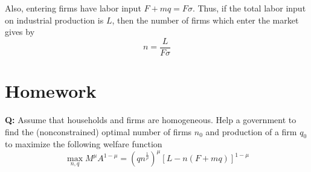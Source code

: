 \documentclass{article}
\begin{document}
Also, entering firms have labor input $F+mq = F \sigma$. Thus, if the total labor input on industrial production is $L$, then the number of firms which enter the market gives by
$$n=\frac{L}{F\sigma}$$

\section{Homework}
\textbf{Q:} Assume that households and firms are homogeneous. Help a government to find the (nonconstrained) optimal number of firms $n_0$ and production of a firm $q_0$ to maximize the following welfare function
$$\max_{n,q} M^{\mu}A^{1-\mu} = (qn^{\frac{1}{\rho}})^{\mu} [L - n ( F+mq)]^{1-\mu}$$
\end{document}
